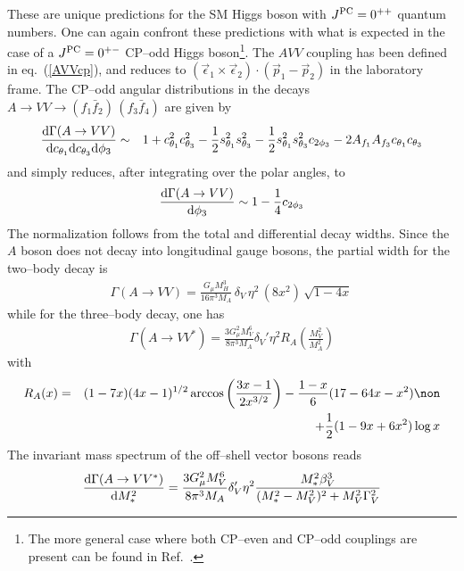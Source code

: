 These are unique predictions for the SM Higgs boson with $J^{\rm PC}=0^{++}$ 
quantum  numbers.  One can again confront these predictions with what is 
expected in the case of a $J^{\rm PC}= 0^{+-}$ CP--odd Higgs 
boson\footnote{The more general case where both CP--even and CP--odd couplings
are present can be found in Ref.~\cite{CP-full}.}.  
The $AVV$ coupling has been defined in eq.~(\ref{AVVcp}), and  reduces to 
$(\vec{\epsilon}_1 \times \vec{\epsilon}_2)\cdot(\vec{p}_1 -\vec{p}_2)$ in the 
laboratory frame.  The CP--odd angular distributions in the decays $ A  
\rightarrow V V \rightarrow  (f_1 \bar{f}_2) \, (f_3 \bar{f}_4)$ are  given 
by \cite{Bargeretal}
\begin{eqnarray}
\frac{ {\rm d}\Gamma (A \rightarrow  VV)} { {\rm d} c_{\theta_1} {\rm
d}c_{\theta_3} {\rm d} \phi_3} & \sim & 1+ c^2_{\theta_1} c^2_{\theta_3} 
-\frac{1}{2} s^2_{\theta_1} s^2_{\theta_3} -\frac{1}{2} s^2_{\theta_1} 
s^2_{\theta_3} c_{2\phi_3} -2 A_{f_1} A_{f_3} c_{\theta_1} c_{\theta_3}
\end{eqnarray}
and simply reduces, after integrating over the polar angles, to 
\begin{eqnarray}
\frac{{\rm d}\Gamma (A \rightarrow  VV)}{  {\rm d} \phi_3 }\sim 1 -
\frac{1}{4} c_{2\phi_3}
\end{eqnarray}
The normalization follows from the total and differential decay widths. Since
the $A$ boson does not decay into longitudinal gauge bosons,
the partial width for the two--body decay is
\begin{eqnarray}
\Gamma (A \rightarrow  VV) = \frac{G_\mu M_H^3}{16 \pi^3 M_A} \, \delta_V  \, 
\eta^2 \, ( 8 x^2 )  \, \sqrt{1-4x} \, 
\end{eqnarray}
while for the three--body decay, one has
\begin{eqnarray}
\Gamma (A \rightarrow  VV^*) = \frac{3 G_\mu^2 M_V^6}{8 \pi^3 M_A} \delta_V'
\eta^2 R_A \left( \frac{M_V^2}{M_A^2} \right)
\end{eqnarray}
with 
\begin{eqnarray}
R_A(x)&=&(1-7x)(4x-1)^{1/2} \arccos \left( \frac{3x-1}{2x^{3/2}}
\right) -\frac{1-x}{6}(17-64x-x^2) \non \\ && + \frac{1}{2}(1-9x+6x^2) \log x
\end{eqnarray}
The invariant mass spectrum of the off--shell vector bosons reads
\begin{eqnarray}
\frac{{\rm d} \Gamma (A \rightarrow  VV^*)}{{\rm d}M_*^2} = \frac{3 G_\mu^2
M_V^6}{8 \pi^3 M_A} \delta_V' \eta^2 \frac{M_*^2 \beta_V^3}{(M_*^2-M_V^2)^2+ 
M_V^2 \Gamma_V^2}
\end{eqnarray}

